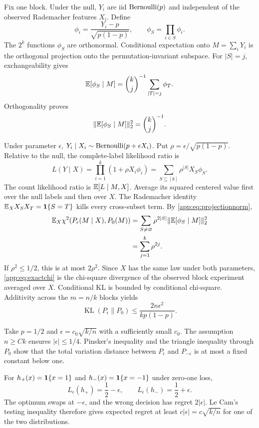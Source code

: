 Fix one block. Under the null, $Y_i$ are iid $\operatorname{Bernoulli}(p)$ and independent of the observed Rademacher features $X_i$. Define
\[
 \phi_i=\frac{Y_i-p}{\sqrt{p(1-p)}},\qquad
 \phi_S=\prod_{i\in S}\phi_i.
\]
The $2^k$ functions $\phi_S$ are orthonormal. Conditional expectation onto $M=\sum_iY_i$ is the orthogonal projection onto the permutation-invariant subspace. For $|S|=j$, exchangeability gives
\begin{equation}
 \mathbb E[\phi_S\mid M]={k\choose j}^{-1}\sum_{|T|=j}\phi_T.
 \label{app:eq:symprojection}
\end{equation}
Orthogonality proves
\begin{equation}
 \|\mathbb E[\phi_S\mid M]\|_2^2={k\choose j}^{-1}.
 \label{app:eq:projectionnorm}
\end{equation}

Under parameter $\epsilon$, $Y_i\mid X_i\sim\operatorname{Bernoulli}(p+\epsilon X_i)$. Put $\rho=\epsilon/\sqrt{p(1-p)}$. Relative to the null, the complete-label likelihood ratio is
\[
 L(Y\mid X)=\prod_{i=1}^k(1+\rho X_i\phi_i)
 =\sum_{S\subseteq[k]}\rho^{|S|}X_S\phi_S.
\]
The count likelihood ratio is $\mathbb E[L\mid M,X]$. Average its squared centered value first over the null labels and then over $X$. The Rademacher identity $\mathbb E_X X_SX_T=\mathbf 1\{S=T\}$ kills every cross-subset term. By \eqref{app:eq:projectionnorm},
\begin{align}
 \mathbb E_X\chi^2(P_\epsilon(M\mid X),P_0(M))
 &=\sum_{S\ne\varnothing}\rho^{2|S|}
   \|\mathbb E[\phi_S\mid M]\|_2^2\\
 &=\sum_{j=1}^k\rho^{2j}.
 \label{app:eq:exactchi}
\end{align}
If $\rho^2\le1/2$, this is at most $2\rho^2$. Since $X$ has the same law under both parameters, \eqref{app:eq:exactchi} is the chi-square divergence of the observed block experiment averaged over $X$. Conditional KL is bounded by conditional chi-square. Additivity across the $m=n/k$ blocks yields
\begin{equation}
 \operatorname{KL}(P_\epsilon\|P_0)
 \le\frac{2n\epsilon^2}{kp(1-p)}.
 \label{app:eq:KL}
\end{equation}

Take $p=1/2$ and $\epsilon=c_0\sqrt{k/n}$ with a sufficiently small $c_0$. The assumption $n\ge Ck$ ensures $|\epsilon|\le1/4$. Pinsker's inequality and the triangle inequality through $P_0$ show that the total variation distance between $P_\epsilon$ and $P_{-\epsilon}$ is at most a fixed constant below one.

For $h_+(x)=\mathbf 1\{x=1\}$ and $h_-(x)=\mathbf 1\{x=-1\}$ under zero-one loss,
\[
 L_\epsilon(h_+)=\frac12-\epsilon,\qquad
 L_\epsilon(h_-)=\frac12+\epsilon.
\]
The optimum swaps at $-\epsilon$, and the wrong decision has regret $2|\epsilon|$. Le Cam's testing inequality therefore gives expected regret at least $c|\epsilon|=c\sqrt{k/n}$ for one of the two distributions.

